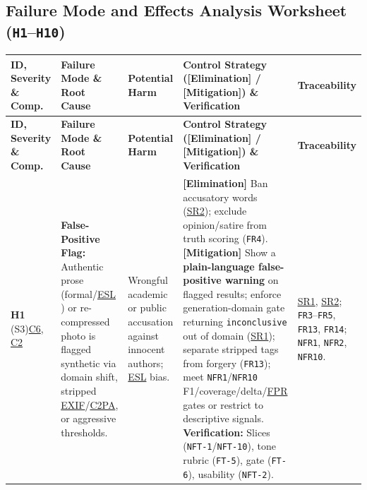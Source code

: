 \documentclass[11pt]{article}
\newcommand{\CTwoPA}{\hyperlink{ha-acr-c2pa}{C2PA}}
\newcommand{\ESL}{\hyperlink{ha-acr-esl}{ESL}}
\newcommand{\EXIF}{\hyperlink{ha-acr-exif}{EXIF}}
\newcommand{\FPR}{\hyperlink{ha-acr-fpr}{FPR}}
\begin{document}
\begin{landscape}
\subsection{Failure Mode and Effects Analysis Worksheet (\texttt{H1}--\texttt{H10})}

\scriptsize
\setlength{\tabcolsep}{4pt}
\renewcommand{\arraystretch}{1.12}
\begin{tabularx}{\linewidth}{P{1.75cm} P{3.2cm} P{2.9cm} Y P{2.25cm}}
\caption{FMEA Worksheet Across Components \hyperref[comp:C1]{C1}--\hyperref[comp:C7]{C7} (\hyperref[haz:H1]{H1}--\hyperref[haz:H10]{H10})} \label{TblFMEA}\\
\toprule
\textbf{ID, Severity \& Comp.} & \textbf{Failure Mode \& Root Cause} & \textbf{Potential Harm} & \textbf{Control Strategy ([Elimination] / [Mitigation]) \& Verification} & \textbf{Traceability}\\
\midrule
\endfirsthead
\toprule
\textbf{ID, Severity \& Comp.} & \textbf{Failure Mode \& Root Cause} & \textbf{Potential Harm} & \textbf{Control Strategy ([Elimination] / [Mitigation]) \& Verification} & \textbf{Traceability}\\
\midrule
\endhead
\bottomrule
\endfoot

\label{haz:H1}\textbf{H1} (S3)\newline \hyperref[comp:C6]{C6}, \hyperref[comp:C2]{C2} &
\textbf{False-Positive Flag:} Authentic prose (formal/\ESL{} \cite{Liang2023ESL}) or re-compressed photo is flagged synthetic via domain shift, stripped \EXIF{}/\CTwoPA{}, or aggressive thresholds. &
Wrongful academic or public accusation against innocent authors; \ESL{} bias. &
\textbf{[Elimination]} Ban accusatory words (\hyperref[SR2]{SR2}); exclude opinion/satire from truth scoring (\texttt{FR4}).\newline
\textbf{[Mitigation]} Show a \textbf{plain-language false-positive warning} on flagged results; enforce generation-domain gate returning \texttt{inconclusive} out of domain (\hyperref[SR1]{SR1}); separate stripped tags from forgery (\texttt{FR13}); meet \texttt{NFR1}/\texttt{NFR10} F1/coverage/delta/\FPR{} gates or restrict to descriptive signals.\newline
\textbf{Verification:} Slices (\texttt{NFT-1}/\texttt{NFT-10}), tone rubric (\texttt{FT-5}), gate (\texttt{FT-6}), usability (\texttt{NFT-2}). &
\hyperref[SR1]{SR1}, \hyperref[SR2]{SR2}; \texttt{FR3}--\texttt{FR5}, \texttt{FR13}, \texttt{FR14}; \texttt{NFR1}, \texttt{NFR2}, \texttt{NFR10}.\\
\midrule


\end{tabularx}
\end{landscape}
\end{document}
